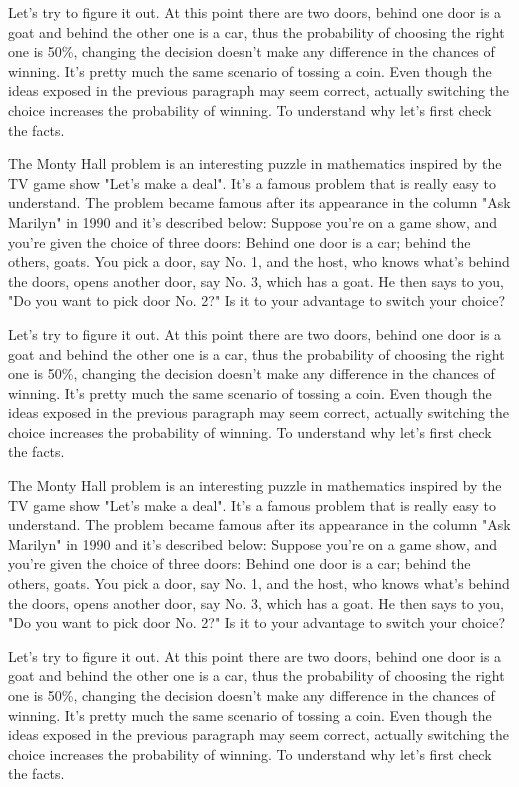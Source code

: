 \documentclass[preprint]{oscmjournal}
\begin{document}
Let's try to figure it out. At this point there are two doors, behind one door is a goat  and behind the other one is a car, thus the probability of choosing the right one is 50\%, changing the decision doesn't make any difference in the chances of winning. It's pretty much the same scenario of tossing a coin. Even though the ideas exposed in the previous paragraph may seem correct, actually switching the choice increases the probability of winning. To understand why let's  first check the facts.

The Monty Hall problem is an interesting puzzle in mathematics inspired by the TV  game show "Let's make a deal". It's a famous problem that is really easy to understand. The problem became famous after its appearance in the column "Ask Marilyn" in 1990 and  it's described below: Suppose you're on a game show, and you're given the choice of three doors: Behind one  door is a car; behind the others, goats. You pick a door, say No. 1, and the host, who  knows what's behind the doors, opens another door, say No. 3, which has a goat. He then  says to you, "Do you want to pick door No. 2?" Is it to your advantage to switch your choice?

Let's try to figure it out. At this point there are two doors, behind one door is a goat  and behind the other one is a car, thus the probability of choosing the right one is 50\%, changing the decision doesn't make any difference in the chances of winning. It's pretty much the same scenario of tossing a coin. Even though the ideas exposed in the previous paragraph may seem correct, actually switching the choice increases the probability of winning. To understand why let's  first check the facts.

The Monty Hall problem is an interesting puzzle in mathematics inspired by the TV  game show "Let's make a deal". It's a famous problem that is really easy to understand. The problem became famous after its appearance in the column "Ask Marilyn" in 1990 and  it's described below: Suppose you're on a game show, and you're given the choice of three doors: Behind one  door is a car; behind the others, goats. You pick a door, say No. 1, and the host, who  knows what's behind the doors, opens another door, say No. 3, which has a goat. He then  says to you, "Do you want to pick door No. 2?" Is it to your advantage to switch your choice?

Let's try to figure it out. At this point there are two doors, behind one door is a goat  and behind the other one is a car, thus the probability of choosing the right one is 50\%, changing the decision doesn't make any difference in the chances of winning. It's pretty much the same scenario of tossing a coin. Even though the ideas exposed in the previous paragraph may seem correct, actually switching the choice increases the probability of winning. To understand why let's  first check the facts.


% 
% 
\printbibliography
\end{document}
